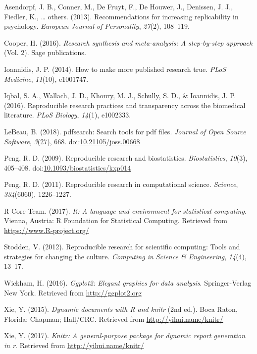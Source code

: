 \documentclass[english,,man]{apa6}
\theoremstyle{definition}
\theoremstyle{definition}
\theoremstyle{definition}
\theoremstyle{remark}
\begin{document}
\leavevmode\hypertarget{ref-asendorpf2013}{}%
Asendorpf, J. B., Conner, M., De Fruyt, F., De Houwer, J., Denissen, J.
J., Fiedler, K., \ldots{} others. (2013). Recommendations for increasing
replicability in psychology. \emph{European Journal of Personality},
\emph{27}(2), 108--119.

\leavevmode\hypertarget{ref-cooper2016}{}%
Cooper, H. (2016). \emph{Research synthesis and meta-analysis: A
step-by-step approach} (Vol. 2). Sage publications.

\leavevmode\hypertarget{ref-ioannidis2014}{}%
Ioannidis, J. P. (2014). How to make more published research true.
\emph{PLoS Medicine}, \emph{11}(10), e1001747.

\leavevmode\hypertarget{ref-iqbal2016}{}%
Iqbal, S. A., Wallach, J. D., Khoury, M. J., Schully, S. D., \&
Ioannidis, J. P. (2016). Reproducible research practices and
transparency across the biomedical literature. \emph{PLoS Biology},
\emph{14}(1), e1002333.

\leavevmode\hypertarget{ref-pdfsearch}{}%
LeBeau, B. (2018). pdfsearch: Search tools for pdf files. \emph{Journal
of Open Source Software}, \emph{3}(27), 668.
doi:\href{https://doi.org/10.21105/joss.00668}{10.21105/joss.00668}

\leavevmode\hypertarget{ref-peng2009}{}%
Peng, R. D. (2009). Reproducible research and biostatistics.
\emph{Biostatistics}, \emph{10}(3), 405--408.
doi:\href{https://doi.org/10.1093/biostatistics/kxp014}{10.1093/biostatistics/kxp014}

\leavevmode\hypertarget{ref-peng2011}{}%
Peng, R. D. (2011). Reproducible research in computational science.
\emph{Science}, \emph{334}(6060), 1226--1227.

\leavevmode\hypertarget{ref-rpro}{}%
R Core Team. (2017). \emph{R: A language and environment for statistical
computing}. Vienna, Austria: R Foundation for Statistical Computing.
Retrieved from \url{https://www.R-project.org/}

\leavevmode\hypertarget{ref-stodden2012}{}%
Stodden, V. (2012). Reproducible research for scientific computing:
Tools and strategies for changing the culture. \emph{Computing in
Science \& Engineering}, \emph{14}(4), 13--17.

\leavevmode\hypertarget{ref-ggplot2}{}%
Wickham, H. (2016). \emph{Ggplot2: Elegant graphics for data analysis}.
Springer-Verlag New York. Retrieved from \url{http://ggplot2.org}

\leavevmode\hypertarget{ref-knitr}{}%
Xie, Y. (2015). \emph{Dynamic documents with R and knitr} (2nd ed.).
Boca Raton, Florida: Chapman; Hall/CRC. Retrieved from
\url{http://yihui.name/knitr/}

\leavevmode\hypertarget{ref-knitrmanual}{}%
Xie, Y. (2017). \emph{Knitr: A general-purpose package for dynamic
report generation in r}. Retrieved from \url{http://yihui.name/knitr/}
\end{document}
